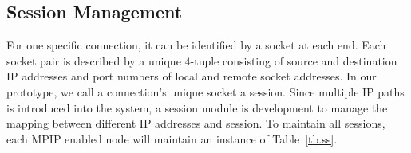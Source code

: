 %
%
%
%
%
%
%
%

%


\subsection{Session Management}
\label{sec:session}

For one specific connection, it can be identified by a socket at each end.  Each socket pair is described by a unique $4$-tuple consisting of source and destination IP addresses and port numbers of local and remote socket addresses. In our prototype, we call a connection's unique socket a session. Since multiple IP paths is introduced into the system, a session module is development to manage the mapping between different IP addresses and session. To maintain all sessions, each MPIP enabled node will maintain an instance of Table~\ref{tb.ss}.

